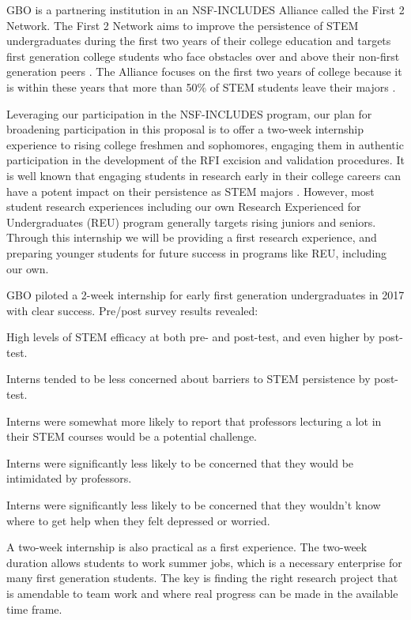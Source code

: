 \documentclass[10pt]{myNSF}
\begin{document}
\label{sec:internship}

GBO is a partnering institution in an NSF-INCLUDES Alliance called the
First 2 Network. The First 2 Network aims to improve the persistence
of STEM undergraduates during the first two years of their college
education and targets first generation college students who face
obstacles over and above their non-first generation peers
\citep[e.g.][]{cbcs18}.  The Alliance focuses on the first two years
of college because it is within these years that more than 50\% of
STEM students leave their majors \cite{che13}.

Leveraging our participation in the NSF-INCLUDES program, our plan for
broadening participation in this proposal is to offer a two-week
internship experience to rising college freshmen and sophomores,
engaging them in authentic participation in the development of the RFI
excision and validation procedures.  It is well known that engaging
students in research early in their college careers can have a potent
impact on their persistence as STEM majors
\citep[e.g.][]{lw91,hfb+13}.  However, most student research
experiences including our own Research Experienced for Undergraduates
(REU) program generally targets rising juniors and seniors. Through
this internship we will be providing a first research experience, and
preparing younger students for future success in programs like REU,
including our own.

GBO piloted a 2-week internship for early first generation
undergraduates in 2017 with clear success.  Pre/post survey results
revealed:
\begin{itemize*}
\item{High levels of STEM efficacy at both pre- and post-test, and
  even higher by post-test.}
\item{Interns tended to be less concerned about barriers to STEM
  persistence by post-test.}
\item{Interns were somewhat more likely to report that professors
  lecturing a lot in their STEM courses would be a potential
  challenge.}
\item{Interns were significantly less likely to be concerned that they
  would be intimidated by professors.}
\item{Interns were significantly less likely to be concerned that they
  wouldn’t know where to get help when they felt depressed or
  worried.}
\end{itemize*}
A two-week internship is also practical as a first experience. The
two-week duration allows students to work summer jobs, which is a
necessary enterprise for many first generation students.  The key is
finding the right research project that is amendable to team work and
where real progress can be made in the available time frame.
\end{document}
